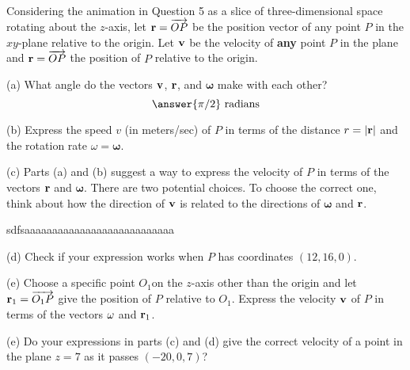 \documentclass{ximera}
\begin{document}
\begin{question}  \label{Qnjy55:Cross}
Considering the animation in Question 5 as a slice of three-dimensional space rotating about the $z$-axis, let ${\bf r} = \overrightarrow{OP}$ be the position vector of any point $P$ in the $xy$-plane relative to the origin. Let ${\bf v}$ be the velocity of {\bf any} point $P$ in the plane and ${\bf r} = \overrightarrow{OP}$ the position of $P$ relative to the origin.

(a) What angle do the vectors ${\bf v}$,  ${\bf r}$, and $\boldsymbol{\omega}$ make with each other?
\[
     \answer{\pi/2}\text{ radians}
\]

(b) Express the speed $v$ (in meters/sec) of $P$ in terms of the distance $r = |{\bf r}|$ and the rotation rate $\omega  =\boldsymbol{\omega}$.

(c) Parts (a) and (b) suggest a way to express the velocity of $P$ in terms of the vectors ${\bf r}$ and $\boldsymbol{\omega}$.
There are two potential choices. To choose the correct one, think about how the direction of ${\bf v}$ is related to the directions of $\boldsymbol{\omega}$ and ${\bf r}$. 


sdfsaaaaaaaaaaaaaaaaaaaaaaaaaaa


(d) Check if your expression works when $P$ has coordinates $(12, 16,0)$.

(e) Choose a specific point $O_1$on the $z$-axis other than the origin and let ${\bf r}_1 = \overrightarrow{O_1P}$ give the position of $P$ relative to $O_1$. Express the velocity ${\bf v}$ of $P$ in terms of the vectors ${\bf\omega}$ and ${\bf r}_1$. 


(e) Do your expressions in parts (c) and (d) give the correct velocity of a point in the plane $z=7$ as it passes $(-20,0,7)$?


\end{question}
\end{document}
